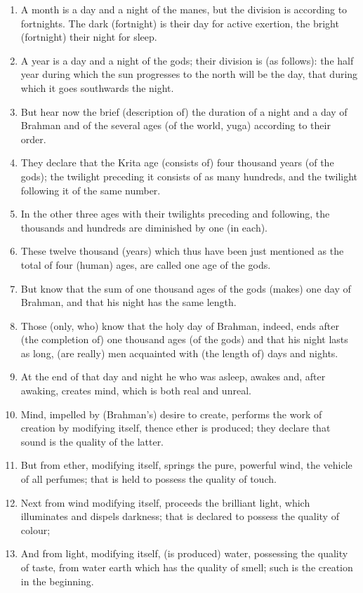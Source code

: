 \begin{enumerate}
\item A month is a day and a night of the manes, but the division is according to fortnights. The dark (fortnight) is their day for active exertion, the bright (fortnight) their night for sleep.
\item A year is a day and a night of the gods; their division is (as follows): the half year during which the sun progresses to the north will be the day, that during which it goes southwards the night.
\item But hear now the brief (description of) the duration of a night and a day of Brahman and of the several ages (of the world, yuga) according to their order.
\item They declare that the Krita age (consists of) four thousand years (of the gods); the twilight preceding it consists of as many hundreds, and the twilight following it of the same number.
\item In the other three ages with their twilights preceding and following, the thousands and hundreds are diminished by one (in each).
\item These twelve thousand (years) which thus have been just mentioned as the total of four (human) ages, are called one age of the gods.
\item But know that the sum of one thousand ages of the gods (makes) one day of Brahman, and that his night has the same length.
\item Those (only, who) know that the holy day of Brahman, indeed, ends after (the completion of) one thousand ages (of the gods) and that his night lasts as long, (are really) men acquainted with (the length of) days and nights.
\item At the end of that day and night he who was asleep, awakes and, after awaking, creates mind, which is both real and unreal.
\item Mind, impelled by (Brahman's) desire to create, performs the work of creation by modifying itself, thence ether is produced; they declare that sound is the quality of the latter.
\item But from ether, modifying itself, springs the pure, powerful wind, the vehicle of all perfumes; that is held to possess the quality of touch.
\item Next from wind modifying itself, proceeds the brilliant light, which illuminates and dispels darkness; that is declared to possess the quality of colour;
\item And from light, modifying itself, (is produced) water, possessing the quality of taste, from water earth which has the quality of smell; such is the creation in the beginning.

\end{enumerate}
